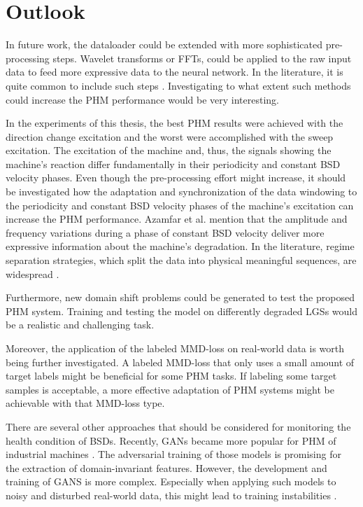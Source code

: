 \chapter{Outlook}
In future work, the dataloader could be extended with more sophisticated pre-processing steps. Wavelet transforms or FFTs, could be applied to the raw input data to feed more expressive data to the neural network. In the literature, it is quite common to include such steps \cite{Li2018} \cite{Kang2020} \cite{Zhang2017}. Investigating to what extent such methods could increase the PHM performance would be very interesting.

In the experiments of this thesis, the best PHM results were achieved with the direction change excitation and the worst were accomplished with the sweep excitation. The excitation of the machine and, thus, the signals showing the machine’s reaction differ fundamentally in their periodicity and constant BSD velocity phases. Even though the pre-processing effort might increase, it should be investigated how the adaptation and synchronization of the data windowing to the periodicity and constant BSD velocity phases of the machine's excitation can increase the PHM performance. Azamfar et al. \cite{AZAMFAR2020103932} mention that the amplitude and frequency variations during a phase of constant BSD velocity deliver more expressive information about the machine's degradation. In the literature, regime separation strategies, which split the data into physical meaningful sequences, are widespread \cite{AZAMFAR2020103932} \cite{Pandhare2021}.

Furthermore, new domain shift problems could be generated to test the proposed PHM system. Training and testing the model on differently degraded LGSs would be a realistic and challenging task.

Moreover, the application of the labeled MMD-loss on real-world data is worth being further investigated. A labeled MMD-loss that only uses a small amount of target labels might be beneficial for some PHM tasks. If labeling some target samples is acceptable, a more effective adaptation of PHM systems might be achievable with that MMD-loss type.

There are several other approaches that should be considered for monitoring the health condition of BSDs. Recently, GANs became more popular for PHM of industrial machines \cite{Zhang2019}. The adversarial training of those models is promising for the extraction of domain-invariant features. However, the development and training of GANS is more complex. Especially when applying such models to noisy and disturbed real-world data, this might lead to training instabilities \cite{Zhang2019}. 



